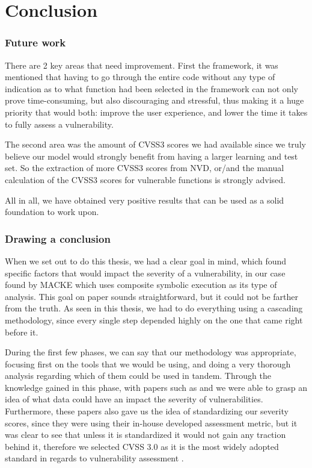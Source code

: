 
\chapter{Conclusion}\label{chapter:Conclusion}

\subsection{Future work}

There are 2 key areas that need improvement. First the framework, it was mentioned that having to go through the entire code without any type of indication as to what function had been selected in the framework can not only prove time-consuming, but also discouraging and stressful, thus making it a huge priority that would both: improve the user experience, and lower the time it takes to fully assess a vulnerability.

The second area was the amount of CVSS3 scores we had available since we truly believe our model would strongly benefit from having a larger learning and test set. So the extraction of more CVSS3 scores from NVD, or/and the manual calculation of the CVSS3 scores for vulnerable functions is strongly advised.

All in all, we have obtained very positive results that can be used as a solid foundation to work upon.

\subsection{Drawing a conclusion}

When we set out to do this thesis, we had a clear goal in mind, which found specific factors that would impact the severity of a vulnerability, in our case found by MACKE which uses composite symbolic execution as its type of analysis. This goal on paper sounds straightforward, but it could not be farther from the truth. As seen in this thesis, we had to do everything using a cascading methodology, since every single step depended highly on the one that came right before it.

During the first few phases, we can say that our methodology was appropriate, focusing first on the tools that we would be using, and doing a very thorough analysis regarding which of them could be used in tandem. Through the knowledge gained in this phase, with papers such as \parencite{ognawala} and \parencite{thomasThesis} we were able to grasp an idea of what data could have an impact the severity of vulnerabilities. Furthermore, these papers also gave us the idea of standardizing our severity scores, since they were using their in-house developed assessment metric, but it was clear to see that unless it is standardized it would not gain any traction behind it, therefore we selected CVSS 3.0 as it is the most widely adopted standard in regards to vulnerability assessment \parencite{cvss3}.

